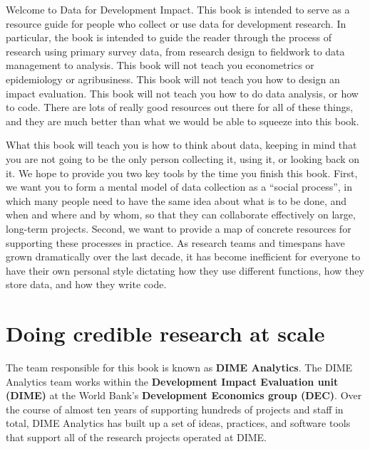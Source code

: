 \begin{fullwidth}
Welcome to Data for Development Impact.
This book is intended to serve as a resource guide
for people who collect or use data for development research.
In particular, the book is intended to guide the reader
through the process of research using primary survey data,
from research design to fieldwork to data management to analysis.
This book will not teach you econometrics or epidemiology or agribusiness.
This book will not teach you how to design an impact evaluation.
This book will not teach you how to do data analysis, or how to code.
There are lots of really good resources out there for all of these things,
and they are much better than what we would be able to squeeze into this book.

What this book will teach you is how to think about data,
keeping in mind that you are not going to be the only person
collecting it, using it, or looking back on it.
We hope to provide you two key tools by the time you finish this book.
First, we want you to form a mental model of data collection as a ``social process'',
in which many people need to have the same idea about what is to be done, and when and where and by whom,
so that they can collaborate effectively on large, long-term projects.
Second, we want to provide a map of concrete resources for supporting these processes in practice.
As research teams and timespans have grown dramatically over the last decade,
it has become inefficient for everyone to have their own personal style
dictating how they use different functions, how they store data, and how they write code.
\end{fullwidth}


\section{Doing credible research at scale}

The team responsible for this book is known as \textbf{DIME Analytics}.
The DIME Analytics team works within the \textbf{Development Impact Evaluation unit (DIME)}
at the World Bank's \textbf{Development Economics group (DEC)}.
Over the course of almost ten years of supporting hundreds of projects and staff in total,
DIME Analytics has built up a set of ideas, practices, and software tools
that support all of the research projects operated at DIME.


